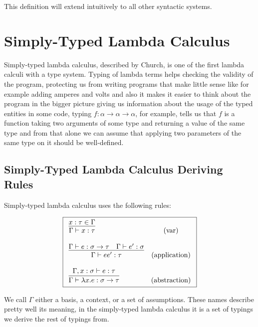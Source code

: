 This definition will extend intuitively to all other syntactic systems.

\section{Simply-Typed Lambda Calculus}

Simply-typed lambda calculus, described by Church, is one of the first %
lambda calculi with a type system. Typing of lambda terms helps checking the validity of the program, protecting us from writing
programs that make little sense like for example adding amperes and volts %
and also it makes it easier to think about the program in the bigger picture giving us information about the usage of the typed entities
in some code, typing $f : \alpha \rightarrow \alpha \rightarrow \alpha$, for example, tells us that $f$ is a function taking two arguments
of some type and returning a value of the same type and from that alone we can assume that applying two parameters of the same type on it
should be well-defined.


\subsection{Simply-Typed Lambda Calculus Deriving Rules}

Simply-typed lambda calculus uses the following rules:

\begin{defn}
    $$\boxed{\begin{array}{l c}
        \infer{\Gamma \vdash x : \tau}{x : \tau \in \Gamma} & (\text{var}) \\\\
        \infer{\Gamma \vdash e e' : \tau}{\Gamma \vdash e : \sigma \rightarrow \tau \quad \Gamma \vdash e' : \sigma} & (\text{application}) \\\\
        \infer{\Gamma \vdash \lambda x . e : \sigma \rightarrow \tau}{\Gamma, x : \sigma \vdash e : \tau} & (\text{abstraction})
    \end{array}}$$
\end{defn}

We call $\Gamma$ either a basis, a context, or a set of assumptions. These names describe pretty well its meaning, in the simply-typed lambda calculus it is a set of typings we derive the rest of typings from.

